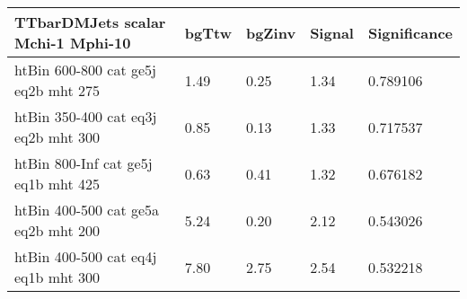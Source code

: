 \begin{tabular}{|l|l|l|l|l|}
\small
   \label{mostSensitiveBins_TTbarDMJets_scalar_Mchi-1_Mphi-10_25ns}
	\textbf{TTbarDMJets scalar Mchi-1 Mphi-10}	 & 	bgTtw	 & 	bgZinv	 & 	Signal &	 Significance \\ 
	\hline
	htBin 600-800 cat ge5j eq2b mht 275 & 	1.49	 & 	0.25	 & 	1.34 	&0.789106 \\ 
	htBin 350-400 cat eq3j eq2b mht 300 & 	0.85	 & 	0.13	 & 	1.33 	&0.717537 \\ 
	htBin 800-Inf cat ge5j eq1b mht 425 & 	0.63	 & 	0.41	 & 	1.32 	&0.676182 \\ 
	htBin 400-500 cat ge5a eq2b mht 200 & 	5.24	 & 	0.20	 & 	2.12 	&0.543026 \\ 
	htBin 400-500 cat eq4j eq1b mht 300 & 	7.80	 & 	2.75	 & 	2.54 	&0.532218 \\ 
\end{tabular}
